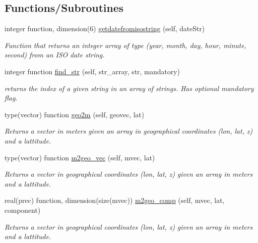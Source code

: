 \subsection*{Functions/\+Subroutines}
\begin{DoxyCompactItemize}
\item 
integer function, dimension(6) \mbox{\hyperlink{namespaceutilities__mod_ab5b97f243f9347a40db76d55509d37ca}{getdatefromisostring}} (self, date\+Str)
\begin{DoxyCompactList}\small\item\em Function that returns an integer array of type (year, month, day, hour, minute, second) from an I\+SO date string. \end{DoxyCompactList}\item 
integer function \mbox{\hyperlink{namespaceutilities__mod_ad446cce78a6509db0e839439a0e84564}{find\+\_\+str}} (self, str\+\_\+array, str, mandatory)
\begin{DoxyCompactList}\small\item\em returns the index of a given string in an array of strings. Has optional mandatory flag. \end{DoxyCompactList}\item 
type(vector) function \mbox{\hyperlink{namespaceutilities__mod_ad6e463f7e5fc49fe4fcd5464326ade01}{geo2m}} (self, geovec, lat)
\begin{DoxyCompactList}\small\item\em Returns a vector in meters given an array in geographical coordinates (lon, lat, z) and a lattitude. \end{DoxyCompactList}\item 
type(vector) function \mbox{\hyperlink{namespaceutilities__mod_a70b21b18c8633b7fd4c3057530d3f16f}{m2geo\+\_\+vec}} (self, mvec, lat)
\begin{DoxyCompactList}\small\item\em Returns a vector in geographical coordinates (lon, lat, z) given an array in meters and a lattitude. \end{DoxyCompactList}\item 
real(prec) function, dimension(size(mvec)) \mbox{\hyperlink{namespaceutilities__mod_ae6b8a45b229e3f1f8c2b12dd74e7a2dd}{m2geo\+\_\+comp}} (self, mvec, lat, component)
\begin{DoxyCompactList}\small\item\em Returns a vector in geographical coordinates (lon, lat, z) given an array in meters and a lattitude. \end{DoxyCompactList}\item 

\end{DoxyCompactItemize}
